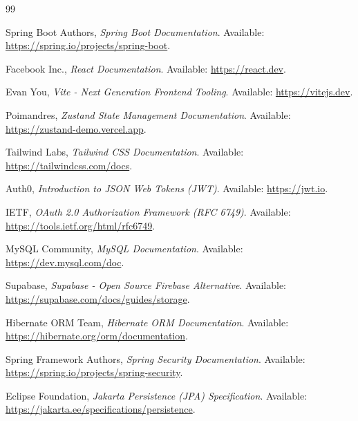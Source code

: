 \documentclass[12pt,a4paper]{report}
\begin{document}
\newpage
{}
\begin{thebibliography}{99}

Spring Boot Authors, \textit{Spring Boot Documentation}. Available: \url{https://spring.io/projects/spring-boot}.

Facebook Inc., \textit{React Documentation}. Available: \url{https://react.dev}.

Evan You, \textit{Vite - Next Generation Frontend Tooling}. Available: \url{https://vitejs.dev}.

Poimandres, \textit{Zustand State Management Documentation}. Available: \url{https://zustand-demo.vercel.app}.

Tailwind Labs, \textit{Tailwind CSS Documentation}. Available: \url{https://tailwindcss.com/docs}.

Auth0, \textit{Introduction to JSON Web Tokens (JWT)}. Available: \url{https://jwt.io}.

IETF, \textit{OAuth 2.0 Authorization Framework (RFC 6749)}. Available: \url{https://tools.ietf.org/html/rfc6749}.

MySQL Community, \textit{MySQL Documentation}. Available: \url{https://dev.mysql.com/doc}.

Supabase, \textit{Supabase - Open Source Firebase Alternative}. Available: \url{https://supabase.com/docs/guides/storage}.

Hibernate ORM Team, \textit{Hibernate ORM Documentation}. Available: \url{https://hibernate.org/orm/documentation}.


Spring Framework Authors, \textit{Spring Security Documentation}. Available: \url{https://spring.io/projects/spring-security}.

Eclipse Foundation, \textit{Jakarta Persistence (JPA) Specification}. Available: \url{https://jakarta.ee/specifications/persistence}.

\end{thebibliography}
\end{document}
